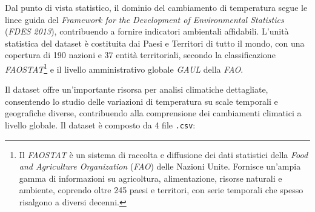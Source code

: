 Dal punto di vista statistico, il dominio del cambiamento di temperatura segue le linee guida del \textit{Framework for the Development of Environmental Statistics} (\textit{FDES 2013}), contribuendo a fornire indicatori ambientali affidabili. L'unità statistica del dataset è costituita dai Paesi e Territori di tutto il mondo, con una copertura di 190 nazioni e 37 entità territoriali, secondo la classificazione \textit{FAOSTAT}\footnote{Il \textit{FAOSTAT} è un sistema di raccolta e diffusione dei dati statistici della \textit{Food and Agriculture Organization} (\textit{FAO}) delle Nazioni Unite. Fornisce un'ampia gamma di informazioni su agricoltura, alimentazione, risorse naturali e ambiente, coprendo oltre 245 paesi e territori, con serie temporali che spesso risalgono a diversi decenni.} e il livello amministrativo globale \textit{GAUL} della \textit{FAO}.

Il dataset offre un'importante risorsa per analisi climatiche dettagliate, consentendo lo studio delle variazioni di temperatura su scale temporali e geografiche diverse, contribuendo alla comprensione dei cambiamenti climatici a livello globale.
\newpage
Il dataset è composto da 4 file \texttt{.csv}:
\vspace{2mm}

